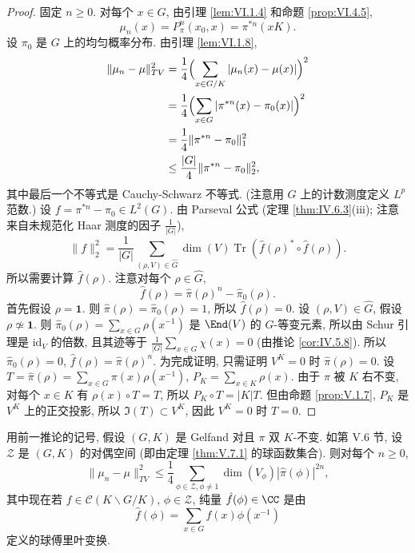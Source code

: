 \begin{proof}
固定 $n \geq 0$. 对每个 $x \in G$, 由引理 \ref{lem:VI.1.4} 和命题 \ref{prop:VI.4.5},
\[
\mu_n(x) = P_{\pi}^n(x_0, x) = \pi^{*n}(xK).
\]
设 $\pi_0$ 是 $G$ 上的均匀概率分布. 由引理 \ref{lem:VI.1.8},
\begin{align*}
\|\mu_n - \mu\|_{TV}^2 &= \frac{1}{4}\Bigl(\sum_{x \in G/K}|\mu_n(x) - \mu(x)|\Bigr)^2 \\
&= \frac{1}{4}\Bigl(\sum_{x \in G}|\pi^{*n}(x) - \pi_0(x)|\Bigr)^2 \\
&= \frac{1}{4}\|\pi^{*n} - \pi_0\|_1^2 \\
&\leq \frac{|G|}{4}\|\pi^{*n} - \pi_0\|_2^2,
\end{align*}
其中最后一个不等式是 Cauchy-Schwarz 不等式. (注意用 $G$ 上的计数测度定义 $L^p$ 范数.) 设 $f = \pi^{*n} - \pi_0 \in L^2(G)$. 由 Parseval 公式 (定理 \ref{thm:IV.6.3}(iii); 注意来自未规范化 Haar 测度的因子 $\frac{1}{|G|}$),
\[
\|f\|_2^2 = \frac{1}{|G|}\sum_{(\rho, V) \in \widehat{G}}\dim(V)\operatorname{Tr}(\hat{f}(\rho)^* \circ \hat{f}(\rho)).
\]
所以需要计算 $\hat{f}(\rho)$. 注意对每个 $\rho \in \widehat{G}$,
\[
\hat{f}(\rho) = \hat{\pi}(\rho)^n - \hat{\pi}_0(\rho).
\]
首先假设 $\rho = \mathbf{1}$. 则 $\hat{\pi}(\rho) = \hat{\pi}_0(\rho) = 1$, 所以 $\hat{f}(\rho) = 0$.
设 $(\rho, V) \in \widehat{G}$, 假设 $\rho \not\simeq \mathbf{1}$. 则 $\hat{\pi}_0(\rho) = \sum_{x \in G}\rho(x^{-1})$ 是 $\End(V)$ 的 $G$-等变元素, 所以由 Schur 引理是 $\mathrm{id}_V$ 的倍数, 且其迹等于 $\frac{1}{|G|}\sum_{x \in G}\chi(x) = 0$ (由推论 \ref{cor:IV.5.8}). 所以 $\hat{\pi}_0(\rho) = 0$, $\hat{f}(\rho) = \hat{\pi}(\rho)^n$. 为完成证明, 只需证明 $V^K = 0$ 时 $\hat{\pi}(\rho) = 0$. 设 $T = \hat{\pi}(\rho) = \sum_{x \in G}\pi(x)\rho(x^{-1})$, $P_K = \sum_{x \in K}\rho(x)$. 由于 $\pi$ 被 $K$ 右不变, 对每个 $x \in K$ 有 $\rho(x) \circ T = T$, 所以 $P_K \circ T = |K|T$. 但由命题 \ref{prop:V.1.7}, $P_K$ 是 $V^K$ 上的正交投影, 所以 $\Im(T) \subset V^K$, 因此 $V^K = 0$ 时 $T = 0$.
\end{proof}

\begin{corollary}
\label{cor:VI.4.7}
用前一推论的记号, 假设 $(G, K)$ 是 Gelfand 对且 $\pi$ 双 $K$-不变. 如第 V.6 节, 设 $\mathcal{Z}$ 是 $(G, K)$ 的对偶空间 (即由定理 \ref{thm:V.7.1} 的球函数集合).
则对每个 $n \geq 0$,
\[
\|\mu_n - \mu\|_{TV}^2 \leq \frac{1}{4}\sum_{\phi \in \mathcal{Z}, \phi \neq 1}\dim(V_{\phi})|\hat{\pi}(\phi)|^{2n},
\]
其中现在若 $f \in \mathcal{C}(K\backslash G/K)$, $\phi \in \mathcal{Z}$, 纯量 $\hat{f}(\phi) \in \CC$ 是由
\[
\hat{f}(\phi) = \sum_{x \in G}f(x)\phi(x^{-1})
\]
定义的球傅里叶变换.
\end{corollary}

